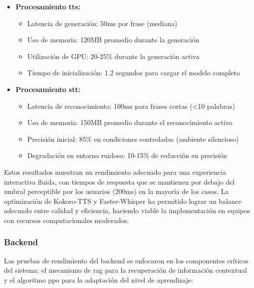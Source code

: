 \begin{itemize}
    \item \textbf{Procesamiento \gls{tts}:}
    \begin{itemize}
        \item Latencia de generación: 50ms por frase (mediana)
        \item Uso de memoria: 120MB promedio durante la generación
        \item Utilización de GPU: 20-25\% durante la generación activa
        \item Tiempo de inicialización: 1.2 segundos para cargar el modelo completo
    \end{itemize}

    \item \textbf{Procesamiento \gls{stt}:}
    \begin{itemize}
        \item Latencia de reconocimiento: 100ms para frases cortas (<10 palabras)
        \item Uso de memoria: 150MB promedio durante el reconocimiento activo
        \item Precisión inicial: 85\% en condiciones controladas (ambiente silencioso)
        \item Degradación en entorno ruidoso: 10-15\% de reducción en precisión
    \end{itemize}
\end{itemize}

Estos resultados muestran un rendimiento adecuado para una experiencia interactiva fluida, con tiempos de respuesta que se mantienen por debajo del umbral perceptible por los usuarios (200ms) en la mayoría de los casos. La optimización de Kokoro-TTS y Faster-Whisper ha permitido lograr un balance adecuado entre calidad y eficiencia, haciendo viable la implementación en equipos con recursos computacionales moderados.

\subsubsection{Backend}
\label{subsubsec:backend-rendimiento}

Las pruebas de rendimiento del backend se enfocaron en los componentes críticos del sistema: el mecanismo de \gls{rag} para la recuperación de información contextual y el algoritmo \gls{ppo} para la adaptación del nivel de aprendizaje:

